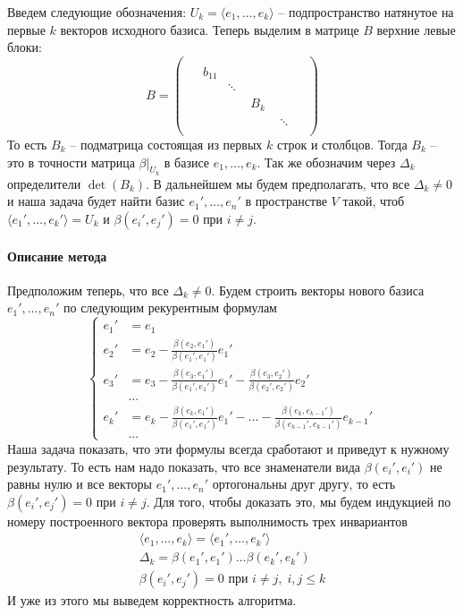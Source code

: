Введем следующие обозначения: $U_k = \langle e_1,\ldots,e_k\rangle$  -- подпространство натянутое на первые $k$ векторов исходного базиса.
Теперь выделим в матрице $B$ верхние левые блоки:
\[
B =
\begin{pmatrix}
{\boxed{
\begin{matrix}
{
\boxed{
\begin{matrix}
{
\boxed{
\begin{matrix}
{\boxed{b_{11}}}&{}\\
{}&{\ddots}
\end{matrix}
}
}&{}\\
{}&{B_k}
\end{matrix}
}
}&{}\\
{}&{\ddots}
\end{matrix}
}
}&{}\\
{}&{}
\end{pmatrix}
\]
То есть $B_k$ -- подматрица состоящая из первых $k$ строк и столбцов.
Тогда $B_k$ -- это в точности матрица $\beta|_{U_k}$ в базисе $e_1,\ldots,e_k$.
Так же обозначим через $\Delta_k$ определители $\det (B_k)$.
В дальнейшем мы будем предполагать, что все $\Delta_k \neq 0$ и наша задача будет найти базис $e_1',\ldots,e_n'$ в пространстве $V$ такой, чтоб $\langle e_1',\ldots,e_k'\rangle = U_k$ и $\beta(e_i',e_j') = 0$ при $i\neq j$.

\paragraph{Описание метода}

Предположим теперь, что все $\Delta_k\neq 0$.
Будем строить векторы нового базиса $e_1',\ldots,e_n'$ по следующим рекурентным формулам
\[
\left\{
\begin{aligned}
e_1' &= e_1\\
e_2'  &= e_2 - \frac{\beta(e_2, e_1')}{\beta(e_1',e_1')}e_1'\\
e_3'  &= e_3 - \frac{\beta(e_3, e_1')}{\beta(e_1',e_1')}e_1'- \frac{\beta(e_3, e_2')}{\beta(e_2',e_2')}e_2'\\
&\ldots\\
e_k' &= e_k - \frac{\beta(e_k, e_1')}{\beta(e_1',e_1')}e_1' - \ldots - \frac{\beta(e_k, e_{k-1}')}{\beta(e_{k-1}',e_{k-1}')}e_{k-1}'\\
&\ldots
\end{aligned}
\right.
\]
Наша задача показать, что эти формулы всегда сработают и приведут к нужному результату.
То есть нам надо показать, что все знаменатели вида $\beta(e_i',e_i')$ не равны нулю и все векторы $e_1',\ldots,e_n'$ ортогональны друг другу, то есть $\beta(e_i', e_j') = 0$ при $i\neq j$.
Для того, чтобы доказать это, мы будем индукцией по номеру построенного вектора проверять выполнимость трех инвариантов
\begin{gather*}
\langle e_1,\ldots,e_k\rangle = \langle e_1',\ldots, e_k'\rangle\\
\Delta_k = \beta(e_1',e_1') \ldots \beta(e_k',e_k')\\
\beta(e_i',e_j') = 0\text{ при }i\neq j,\;i,j\leqslant k
\end{gather*}
И уже из этого мы выведем корректность алгоритма.

